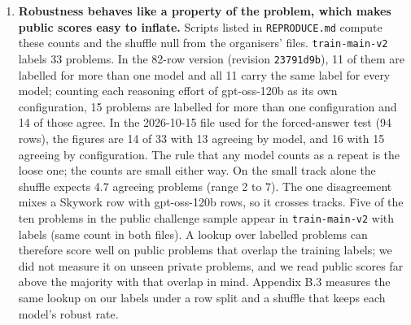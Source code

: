 \documentclass{article}
\begin{document}
\begin{enumerate}
  The train file labels a model on a problem by the largest accuracy drop over the perturbation
  types (Section 2). In the organisers' \texttt{augmented-sample-math-agg-filtered} (54 rows),
  the perturbation type (\texttt{permutation\_type}: \texttt{typos}, \texttt{distract} for an irrelevant sentence, \texttt{rename}, \texttt{rephrase}, \texttt{domain} for a change of setting) is a single type for 43 rows (32 \texttt{domain}, 59 \% of all 54) and a list for 11
  rows (3 one-element \texttt{{[}"distract"{]}}, 8 with two to five types). All 34 \texttt{domain} and \texttt{rephrase} rows are non-robust, so the 11 robust rows are among the other 20,
  while our typo, distractor and rename copies include neither perturbation. Restricted to the 12 rows
  whose problem has only typos, distract or rename perturbations in every one of its source rows (8 single-type rows, 4 list rows; 4
  robust), the mean-flip AUC is 0.547 {[}0.10, 0.89{]} (same 4,000-draw problem bootstrap,
  \texttt{-\/-permutations}). With fewer than 5 robust rows the restricted test is underpowered and cannot say
  whether the sign reverses. On the competition-style labels the
  in-sample AUC is 0.71, but the held-out rule gets 18 of 34 against a majority of 24, so the
  null stands. The 52 augmented rows give 41 against 41, again no gain.
\item
  \textbf{Robustness behaves like a property of the problem, which makes public scores easy to
  inflate.} Scripts listed in \texttt{REPRODUCE.md} compute these counts and the shuffle null from the organisers' files.
  \texttt{train-main-v2} labels 33 problems. In the 82-row version (revision \texttt{23791d9b}), 11 of them are
  labelled for more than one model and all 11 carry the same label for every model; counting
  each reasoning effort of gpt-oss-120b as its own configuration, 15 problems are labelled for
  more than one configuration and 14 of those agree. In the 2026-10-15 file used for the
  forced-answer test (94 rows), the figures are 14 of 33 with 13 agreeing by model, and 16 with
  15 agreeing by configuration. The rule that any model counts as a repeat is the loose one; the counts are small
  either way. On the small track alone the shuffle expects 4.7 agreeing problems (range 2 to 7).
  The one disagreement mixes a Skywork row with gpt-oss-120b rows, so it crosses tracks. Five of the ten problems in the public challenge sample appear in \texttt{train-main-v2}
  with labels (same count in both files). A lookup over labelled problems can therefore score
  well on public problems that overlap the training labels; we did not measure it on unseen private
  problems, and we read public scores far above the majority with that overlap in mind. Appendix B.3
  measures the same lookup on our labels under a row split and a shuffle that keeps each model's
  robust rate.
\end{enumerate}
\end{document}
